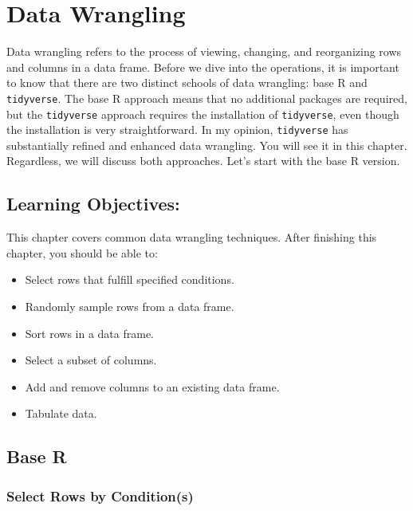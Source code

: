 \documentclass[
  letterpaper,
  DIV=11,
  numbers=noendperiod]{scrreprt}
\begin{document}
\chapter{Data Wrangling}\label{sec-02-data-wrangling}

Data wrangling refers to the process of viewing, changing, and
reorganizing rows and columns in a data frame. Before we dive into the
operations, it is important to know that there are two distinct schools
of data wrangling: base R and \texttt{tidyverse}. The base R approach
means that no additional packages are required, but the
\texttt{tidyverse} approach requires the installation of
\texttt{tidyverse}, even though the installation is very
straightforward. In my opinion, \texttt{tidyverse} has substantially
refined and enhanced data wrangling. You will see it in this chapter.
Regardless, we will discuss both approaches. Let's start with the base R
version.

\section*{Learning Objectives:}\label{learning-objectives-1}


This chapter covers common data wrangling techniques. After finishing
this chapter, you should be able to:

\begin{itemize}
\item
  Select rows that fulfill specified conditions.
\item
  Randomly sample rows from a data frame.
\item
  Sort rows in a data frame.
\item
  Select a subset of columns.
\item
  Add and remove columns to an existing data frame.
\item
  Tabulate data.
\end{itemize}

\section{Base R}\label{base-r}

\subsection{Select Rows by
Condition(s)}\label{select-rows-by-conditions}
\end{document}
